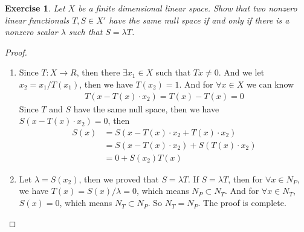 \documentclass[11pt]{book}
\newtheorem{exercise}{Exercise}[section]
\theoremstyle{definition}
\numberwithin{equation}{chapter}
\begin{document}
\begin{exercise}
Let $X$ be a finite dimensional linear space. Show that two nonzero linear functionals $T,S\in X'$ have the same null space if and only if there is a nonzero scalar $\lambda$ such that $S = \lambda T$.
\end{exercise}
\begin{proof}
~\begin{enumerate}[label=(\alph*)]
    \item Since $T: X \rightarrow R$, then there $\exists x_1 \in X$ such that $T x \neq 0$. And we let $x_2  = x_1 / T(x_1)$, then we have $T(x_2) = 1$. And for $\forall x \in X$ we can know
    \begin{align*}
        T(x - T(x)\cdot x_2) = T(x) - T(x) = 0
    \end{align*}
    Since $T$ and $S$ have the same null space, then we have $S(x - T(x)\cdot x_2) = 0$, then 
    \begin{align*}
        S(x) & = S(x - T(x)\cdot x_2 + T(x)\cdot x_2) \\
        & = S(x - T(x)\cdot x_2) + S(T(x)\cdot x_2) \\
        & = 0 + S(x_2) T(x)
    \end{align*}
    \item Let $\lambda = S(x_2)$, then we proved that $S = \lambda T$.
    If $S = \lambda T$, then for $\forall x \in N_P$, we have $T(x) = S(x) / \lambda = 0$, which means $N_P \subset N_T$. And for $\forall x \in N_T$, $S(x) = 0$, which means $N_T \subset N_P$. So $N_T = N_P$. The proof is complete.
\end{enumerate}
\end{proof}

\medskip
\end{document}
